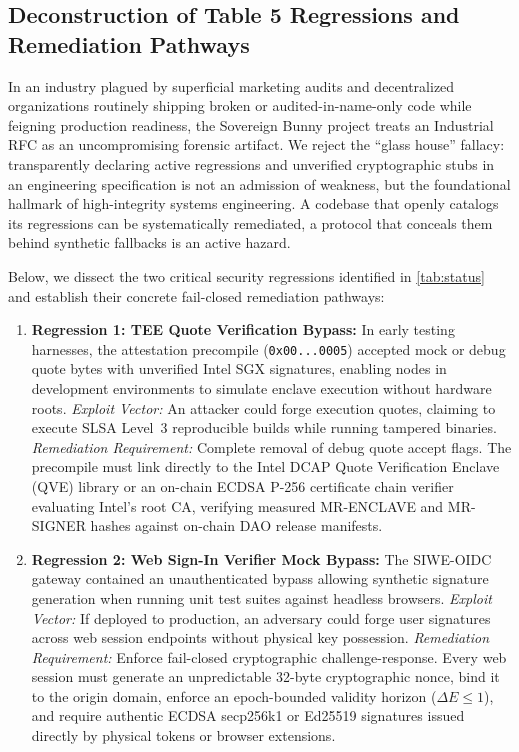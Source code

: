 \documentclass[a4paper,11pt,twoside,parskip=half-,headings=small]{scrartcl}
\newcommand{\code}[1]{\texttt{#1}}
\begin{document}
\subsection{Deconstruction of Table 5 Regressions and Remediation Pathways}
\label{sec:regression_deconstruction}

In an industry plagued by superficial marketing audits and decentralized organizations routinely shipping broken or audited-in-name-only code while feigning production readiness, the Sovereign Bunny project treats an Industrial RFC as an uncompromising forensic artifact. We reject the ``glass house'' fallacy: transparently declaring active regressions and unverified cryptographic stubs in an engineering specification is not an admission of weakness, but the foundational hallmark of high-integrity systems engineering. A codebase that openly catalogs its regressions can be systematically remediated, a protocol that conceals them behind synthetic fallbacks is an active hazard.

Below, we dissect the two critical security regressions identified in \cref{tab:status} and establish their concrete fail-closed remediation pathways:

\begin{enumerate}
  \item \textbf{Regression 1: TEE Quote Verification Bypass:}
In early testing harnesses, the attestation precompile (\code{0x00...0005}) accepted
mock or debug quote bytes with unverified Intel SGX signatures, enabling nodes in
development environments to simulate enclave execution without hardware roots.
\emph{Exploit Vector:} An attacker could forge execution quotes, claiming to execute
SLSA Level~3 reproducible builds while running tampered binaries.
\emph{Remediation Requirement:} Complete removal of debug quote accept flags. The
precompile must link directly to the Intel DCAP Quote Verification Enclave (QVE)
library or an on-chain ECDSA P-256 certificate chain verifier evaluating Intel's
root CA, verifying measured MR-ENCLAVE and MR-SIGNER hashes against on-chain DAO release manifests.
  \item \textbf{Regression 2: Web Sign-In Verifier Mock Bypass:}
The SIWE-OIDC gateway contained an unauthenticated bypass allowing synthetic
signature generation when running unit test suites against headless browsers.
\emph{Exploit Vector:} If deployed to production, an adversary could forge user
signatures across web session endpoints without physical key possession.
\emph{Remediation Requirement:} Enforce fail-closed cryptographic challenge-response.
Every web session must generate an unpredictable 32-byte cryptographic nonce, bind
it to the origin domain, enforce an epoch-bounded validity horizon ($\Delta E \le 1$), and require authentic
ECDSA secp256k1 or Ed25519 signatures issued directly by physical tokens or browser extensions.
\end{enumerate}
\end{document}
